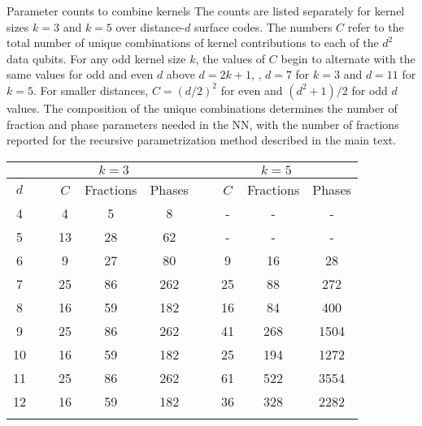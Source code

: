 \begin{table}[htbp]
\centering
\ccaption
{Parameter counts to combine kernels}
{
The counts are listed separately for kernel sizes $k=3$ and $k=5$ over distance-$d$ surface codes.
The numbers $C$ refer to the total number of unique combinations of kernel contributions to each of the $d^2$ data qubits.
For any odd kernel size $k$, the values of $C$ begin to alternate with the same values for odd and even $d$ above $d=2k+1$, \ie, $d=7$ for $k=3$ and $d=11$ for $k=5$.
For smaller distances, $C=(d/2)^2$ for even and $(d^2+1)/2$ for odd $d$ values.
The composition of the unique combinations determines the number of fraction and phase parameters needed in the NN,
with the number of fractions reported for the recursive parametrization method described in the main text.
}
\renewcommand{\arraystretch}{1.25}
\begin{tabular}{c ccc ccc}
\hline
      & \multicolumn{3}{c}{$k=3$}   & \multicolumn{3}{c}{$k=5$} \\
\hline
$d$ & ~~~$C$ & Fractions & Phases & ~~~$C$ & Fractions & Phases \\
\hline
4 & ~~~4 & 5 & 8 & ~~~- & - & - \\
5 & ~~~13 & 28 & 62 & ~~~- & - & - \\
6 & ~~~9 & 27 & 80 & ~~~9 & 16 & 28 \\
7 & ~~~25 & 86 & 262 & ~~~25 & 88 & 272 \\
8 & ~~~16 & 59 & 182 & ~~~16 & 84 & 400 \\
9 & ~~~25 & 86 & 262 & ~~~41 & 268 & 1504 \\
10 & ~~~16 & 59 & 182 & ~~~25 & 194 & 1272 \\
11 & ~~~25 & 86 & 262 & ~~~61 & 522 & 3554 \\
12 & ~~~16 & 59 & 182 & ~~~36 & 328 & 2282 \\
\hline
\label{table:unique-kern-contribs}
\end{tabular}
\end{table}



